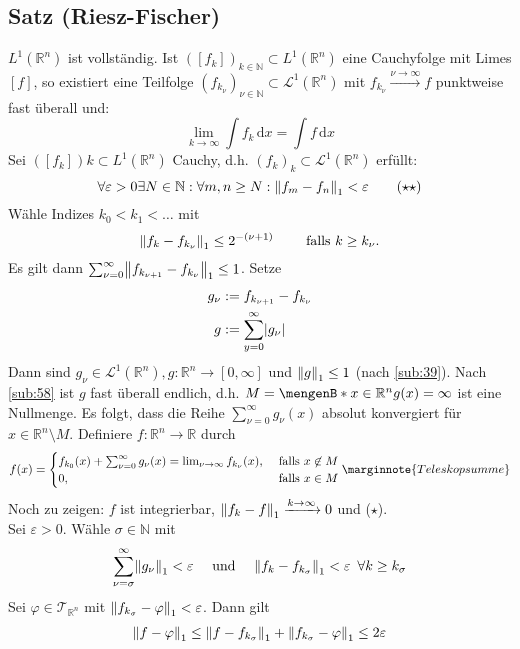 \subsection{Satz (Riesz-Fischer)} %
\label{sub:63}
$L^1(\mathds{R}^n)$ ist vollständig. Ist $([f_k])_{k \in \mathds{N}} \subset L^1(\mathds{R}^n)$ eine Cauchyfolge mit Limes $[f]$, so existiert eine Teilfolge 
$(f_{k_\nu})_{\nu \in \mathds{N}} \subset \mathcal{L}^1(\mathds{R}^n)$ mit $f_{k_\nu} \xrightarrow{\nu \to \infty} f$ punktweise fast überall und:
\[
	\lim_{ k \to \infty} \int\! f_k  \, \mathrm{d}x = \int\! f  \, \mathrm{d}x \tag{$\star$}
\] 
Sei $([f_k])k \subset L^1(\mathds{R}^n)$ Cauchy, d.h. $(f_k)_k \subset \mathcal{L}^1(\mathds{R}^n)$ erfüllt:
\[
	\forall \varepsilon >0 \exists N \in \mathds{N} : \forall m,n \ge N : \norm[1]{f_m -f_n} < \varepsilon \tag{$\star\star$} 
\]
Wähle Indizes $k_0 < k_1 < \ldots $ mit
\[
	\norm[1]{f_k - f_{k_\nu}} \le 2^{-(\nu+1)} \qquad \text{ falls } k \ge k_\nu.
\]
Es gilt dann $\sum_{\nu=0}^{\infty} \norm[1]{f_{k_{\nu+1}} - f_{k_\nu}} \le 1 $. Setze 
\begin{align*}
	g_\nu &:= f_{k_{\nu+1}} - f_{k_\nu}\\
	g &:= \sum_{y=0}^{\infty} \lvert g_\nu\rvert
\end{align*}
Dann sind $g_\nu \in \mathcal{L}^1(\mathds{R}^n), g: \mathds{R}^n \to [0,\infty]$ und $\norm[1]{g} \le 1 $ (nach \ref{sub:39}). Nach \ref{sub:58} ist $g$ fast überall 
endlich, d.h. $M= \set[x \in \mathds{R}^n]{g(x)=\infty} $ ist eine Nullmenge. Es folgt, dass die Reihe $\sum_{\nu=0}^{\infty} g_\nu (x) $ absolut konvergiert für
$x \in \mathds{R}^n \setminus M$. Definiere $f : \mathds{R}^n \to \mathds{R}$ durch
\[
	f(x) = \begin{cases}
		f_{k_0}(x) + \sum_{\nu=0}^{\infty} g_\nu (x) = \lim_{ \nu \to \infty} f_{k_\nu}(x), &\text{ falls }x \not\in M\\
		0 , &\text{ falls } x \in M
	\end{cases} \marginnote{Teleskopsumme}
\]
Noch zu zeigen: $f$ ist integrierbar, $\norm[1]{f_k -f} \xrightarrow{k \to \infty} 0 $ und ($\star$). \\
Sei $\varepsilon>0$. Wähle $\sigma \in \mathds{N}$ mit
\[
	\sum_{\nu=\sigma}^{\infty} \norm[1]{g_\nu} < \varepsilon \quad \text{ und } \quad \norm[1]{f_k - f_{k_\sigma}}< \varepsilon \enspace\forall k \ge k_\sigma 
\]
Sei $\varphi \in \mathcal{T}_{\mathds{R}^n}$ mit $\norm[1]{f_{k_\sigma} - \varphi} < \varepsilon $. Dann gilt
\begin{align*}
	\norm[1]{f- \varphi} \le \norm[1]{f- f_{k_\sigma}} + \norm[1]{f_{k_\sigma} - \varphi} \le 2 \varepsilon   
\end{align*}
